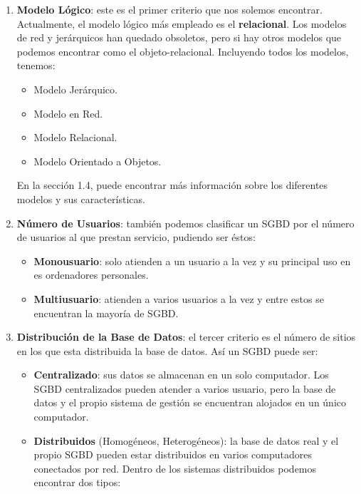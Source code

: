 \begin{enumerate}[label=(\alph*)]
    \item \textbf{Modelo Lógico}: este es el primer criterio que nos solemos encontrar. Actualmente, el modelo lógico más empleado es el \textbf{relacional}. Los modelos de red y jerárquicos han quedado obsoletos, pero si hay otros modelos que podemos encontrar como el objeto-relacional. Incluyendo todos los modelos, tenemos:
    \begin{itemize}
        \item Modelo Jerárquico.
        \item Modelo en Red.
        \item Modelo Relacional.
        \item Modelo Orientado a Objetos.
    \end{itemize}

    En la sección 1.4, puede encontrar más información sobre los diferentes modelos y sus características.

    \item \textbf{Número de Usuarios}: también podemos clasificar un SGBD por el número de usuarios al que prestan servicio, pudiendo ser éstos:

    \begin{itemize}
        \item \textbf{Monousuario}: solo atienden a un usuario a la vez y su principal uso en es ordenadores personales.

        \item \textbf{Multiusuario}: atienden a varios usuarios a la vez y entre estos se encuentran la mayoría de SGBD.
    \end{itemize}

    \item \textbf{Distribución de la Base de Datos}: el tercer criterio es el número de sitios en los que esta distribuida la base de datos. Así un SGBD puede ser:

    \begin{itemize}
        \item \textbf{Centralizado}: sus datos se almacenan en un solo computador. Los SGBD centralizados pueden atender a varios usuario, pero la base de datos y el propio sistema de gestión se encuentran alojados en un único computador.

        \item \textbf{Distribuidos} (Homogéneos, Heterogéneos): la base de datos real y el propio SGBD pueden estar distribuidos en varios computadores conectados por red. Dentro de los sistemas distribuidos podemos encontrar dos tipos:


\end{itemize}
\end{enumerate}
